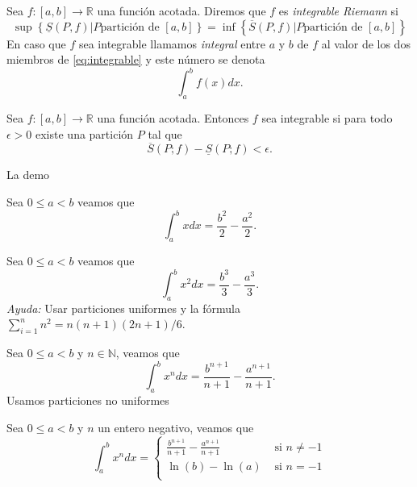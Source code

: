 \begin{definicion}{} Sea $f:[a,b]\to\mathbb{R}$ una función acotada. Diremos que $f$ es {\em integrable Riemann}  si 
\begin{equation}\label{eq:integrable}
 \sup\left\{\underline{S}(P,f)| P \text{partición de }[a,b]\right\}=\inf\left\{\overline{S}(P,f)| P \text{partición de }[a,b]\right\}
\end{equation}
En caso que $f$ sea integrable llamamos {\em integral}  entre $a$ y $b$ de $f$ al valor de los dos miembros de \eqref{eq:integrable} y este número se denota
\[
\int_a^bf(x)dx. 
\]
 
\end{definicion}
 
\begin{teorema}{}  Sea $f:[a,b]\to\mathbb{R}$ una función acotada. Entonces  $f$ sea integrable si para todo $\epsilon>0$ existe una partición $P$ tal que 
\begin{equation}\label{eq:Crit1Int}
 \overline{S}(P;f)-\underline{S}(P;f)<\epsilon.
\end{equation}
 
\end{teorema}

\begin{demo} La demo
 
\end{demo}


\begin{ejemplo}{} Sea $0\leq a<b$ veamos que 
\[
 \int_a^b x dx=\frac{b^2}{2}-\frac{a^2}{2}.
\]
\end{ejemplo}


\begin{ejercicio}{} Sea $0\leq a<b$ veamos que 
\[
 \int_a^b x^2 dx=\frac{b^3}{3}-\frac{a^3}{3}.
\]
{\em Ayuda:} Usar particiones uniformes y la fórmula $\sum_{i=1}^nn^2= n(n+1)(2n+1)/6$.
\end{ejercicio}

\begin{ejemplo}{} Sea $0\leq a<b$ y $n\in\mathbb{N}$,  veamos que 
\[
 \int_a^b x^n dx=\frac{b^{n+1}}{n+1}-\frac{a^{n+1}}{n+1}.
\]
Usamos particiones no uniformes
\end{ejemplo}

\begin{ejercicio}{} Sea $0\leq a<b$ y $n$ un entero negativo, veamos que
\[
 \int_a^b x^n dx=\begin{cases}
                  \frac{b^{n+1}}{n+1}-\frac{a^{n+1}}{n+1} & \text{ si } n\neq -1\\
                  \ln(b)-\ln(a) & \text{ si } n=-1\\
                 \end{cases}
\]
\end{ejercicio}


